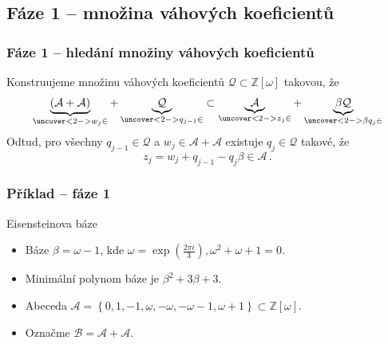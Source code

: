 \documentclass[11pt]{beamer}
\newcommand{\Zomega}{\mathbb{Z}[\omega]}
\newcommand{\A}{\mathcal{A}}
\newcommand{\B}{\mathcal{B}}
\newcommand{\Q}{\mathcal{Q}}
\begin{document}
\subsection{Fáze 1 -- množina váhových koeficientů}
\begin{frame}
    \frametitle{Fáze 1 -- hledání množiny váhových koeficientů}
    Konstruujeme množinu váhových koeficientů $\Q \subset \Zomega$ takovou, že
    $$
    \underbrace{(\A+\A)}_{\uncover<2->{w_j \in}}+ \underbrace{\Q}_{\uncover<2->{q_{j-1} \in}} \subset \underbrace{\A}_{\uncover<2->{z_j \in}} + \underbrace{\beta \Q}_{\uncover<2->{\beta q_j \in}}
    $$
    \pause
    Odtud, pro všechny $q_{j-1} \in \Q$ a $w_j \in \A+\A$ existuje $q_j \in \Q$ takové, že
    $$
    z_j=w_j + q_{j-1} - q_j \beta \in \A \,.
    $$
\end{frame}


\begin{frame}
    \frametitle{Příklad -- fáze 1}
    \begin{block}{Eisensteinova báze}
        \begin{itemize}
            \item Báze $\beta = \omega - 1 $, kde $\omega=\exp(\frac{2 \pi i}{3}), \omega^2+\omega+1=0$.
            \item Minimální polynom báze je $ \beta^{2} + 3\beta + 3 $.
            \item Abeceda $ \A=\left\{0, 1, -1, \omega, -\omega, -\omega - 1, \omega + 1\right\} \subset \Zomega$.
            \item Označme $\B=\A+\A$.
        \end{itemize}
    \end{block}
\end{frame}
\end{document}
